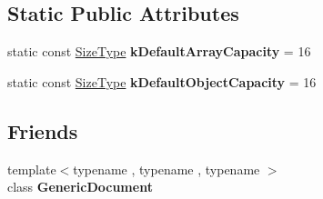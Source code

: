 \subsection*{Static Public Attributes}
\begin{DoxyCompactItemize}
\item 
\mbox{\label{a01992_a188f57bdb1923c1fefe74baa995871a3}} 
static const \hyperlink{a00560_a5ed6e6e67250fadbd041127e6386dcb5}{Size\+Type} {\bfseries k\+Default\+Array\+Capacity} = 16
\item 
\mbox{\label{a01992_a284d018914629aed9a4bd97fe2dc5899}} 
static const \hyperlink{a00560_a5ed6e6e67250fadbd041127e6386dcb5}{Size\+Type} {\bfseries k\+Default\+Object\+Capacity} = 16
\end{DoxyCompactItemize}
\subsection*{Friends}
\begin{DoxyCompactItemize}
\item 
\mbox{\label{a01992_ab05bc9e52e201a2867ea5bac141ee1ae}} 
{\footnotesize template$<$typename , typename , typename $>$ }\\class {\bfseries Generic\+Document}
\end{DoxyCompactItemize}
